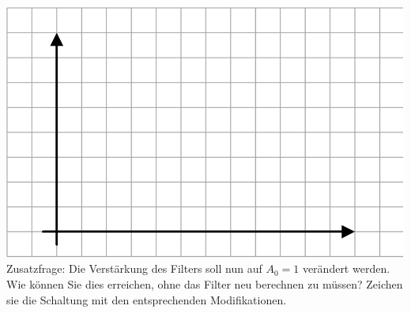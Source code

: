 \documentclass[A4]{scrreprt}
\begin{document}
  \includegraphics{normpaper.png}\\
  Zusatzfrage: Die Verstärkung des Filters soll nun auf $A_0 = 1$ verändert werden. Wie können Sie dies erreichen, ohne das Filter neu berechnen zu müssen? Zeichen sie die Schaltung mit den entsprechenden Modifikationen.
\end{document}
